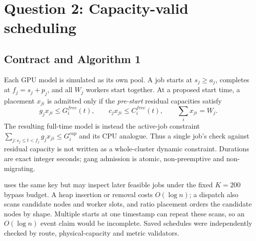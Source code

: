 \section{Question 2: Capacity-valid scheduling}
\label{sec:r2q2}
\subsection{Contract and Algorithm 1}
Each GPU model is simulated as its own pool. A job starts at $s_j\ge a_j$, completes at $f_j=s_j+p_j$, and all $W_j$ workers start together. At a proposed start time, a placement $x_{ji}$ is admitted only if the \emph{pre-start} residual capacities satisfy
\begin{equation}
 g_jx_{ji}\le G_i^{free}(t),\qquad c_jx_{ji}\le C_i^{free}(t),\qquad \sum_i x_{ji}=W_j.
\end{equation}
The resulting full-time model is instead the active-job constraint $\sum_{j:s_j\le t<f_j}g_jx_{ji}\le G_i^{cap}$ and its CPU analogue. Thus a single job's check against residual capacity is not written as a whole-cluster dynamic constraint. Durations are exact integer seconds; gang admission is atomic, non-preemptive and non-migrating.


 uses the same key but may inspect later feasible jobs under the fixed $K=200$ bypass budget. A heap insertion or removal costs $O(\log n)$; a dispatch also scans candidate nodes and worker slots, and ratio placement orders the candidate nodes by shape. Multiple starts at one timestamp can repeat these scans, so an $O(\log n)$ event claim would be incomplete. Saved schedules were independently checked by route, physical-capacity and metric validators.

